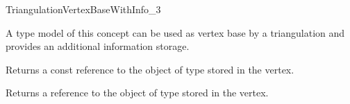 

\begin{ccRefConcept}{TriangulationVertexBaseWithInfo_3}


\ccDefinition
A type model of this concept can be used as vertex base by a triangulation
and provides an additional information storage.



\ccTypes
{}




\ccAccessFunctions
{}

{Returns a const reference to the object of type  stored in the
vertex.} 


{Returns a reference to the object of type  stored in the vertex.} 

\ccHasModels


\end{ccRefConcept}
